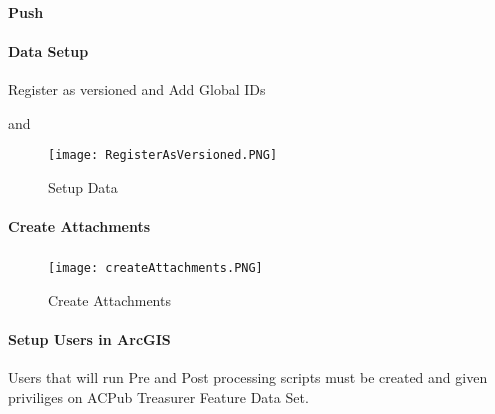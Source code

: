 \paragraph*{\Large Push }
\clearpage
\paragraph{\Large Data Setup}
\vspace{.2in}

Register as versioned and Add Global IDs
\vspace{.2in}

\vspace{.2in}

and
\vspace{.2in}

\vspace{.2in}

\begin{figure}[h!]
\centering
    \texttt{[image: RegisterAsVersioned.PNG]}
\caption{Setup Data}
\end{figure}
\clearpage
\paragraph[Create Attachments]{\Large Create Attachments\texorpdfstring{\\}{}}

\vspace{.3in}

\subparagraph*{}
\begin{figure}[h!]
\centering
    \texttt{[image: createAttachments.PNG]}
\caption{Create Attachments}
\end{figure}
\clearpage
\paragraph[Setup Users in ArcGIS]{\Large Setup Users in ArcGIS\texorpdfstring{\\}{}}

Users that will run Pre and Post processing scripts must be created and given priviliges on ACPub Treasurer Feature Data Set.
\vspace{.35in}

